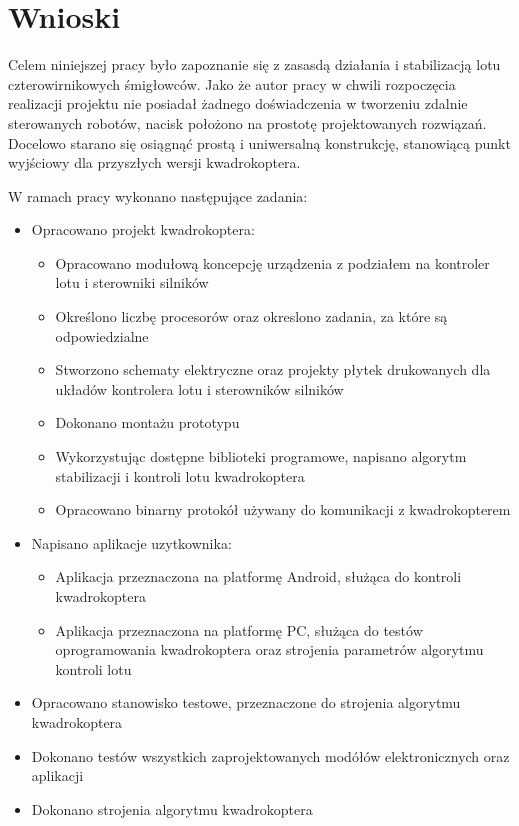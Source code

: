 
\chapter{Wnioski} %

\label{Chapter8} %


Celem niniejszej pracy było zapoznanie się z zasasdą działania i stabilizacją lotu czterowirnikowych śmigłowców. Jako że autor pracy w chwili rozpoczęcia realizacji projektu nie posiadał żadnego doświadczenia w tworzeniu zdalnie sterowanych robotów, nacisk położono na prostotę projektowanych rozwiązań. Docelowo starano się osiągnąć prostą i uniwersalną konstrukcję, stanowiącą punkt wyjściowy dla przyszłych wersji kwadrokoptera.

W ramach pracy wykonano następujące zadania:
\begin{itemize}
	\item Opracowano projekt kwadrokoptera:
	\begin{itemize}
		\item Opracowano modułową koncepcję urządzenia z podziałem na kontroler lotu i sterowniki silników
		\item Określono liczbę procesorów oraz okreslono zadania, za które są odpowiedzialne
		\item Stworzono schematy elektryczne oraz projekty płytek drukowanych dla układów kontrolera lotu i sterowników silników
		\item Dokonano montażu prototypu
		\item Wykorzystując dostępne biblioteki programowe, napisano algorytm stabilizacji i kontroli lotu kwadrokoptera
		\item Opracowano binarny protokół używany do komunikacji z kwadrokopterem
	\end{itemize}
	\item Napisano aplikacje uzytkownika:
	\begin{itemize}
		\item Aplikacja przeznaczona na platformę Android, służąca do kontroli kwadrokoptera
		\item Aplikacja przeznaczona na platformę PC, służąca do testów oprogramowania kwadrokoptera oraz strojenia parametrów algorytmu kontroli lotu
	\end{itemize}
	\item Opracowano stanowisko testowe, przeznaczone do strojenia algorytmu kwadrokoptera	
	\item Dokonano testów wszystkich zaprojektowanych modółów elektronicznych oraz aplikacji
	\item Dokonano strojenia algorytmu kwadrokoptera
\end{itemize}

